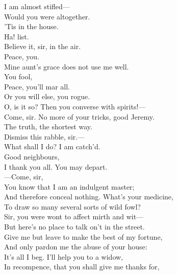 \documentclass[a4paper,oneside]{memoir}
\begin{document}
\begin{drama*}
\dapperspeaks {} I am almost stifled---\\
\facespeaks {} Would you were altogether.\\
\lovewitspeaks {} 'Tis in the house.\\
Ha! list.\\
\facespeaks {} Believe it, sir, in the air.\\
\lovewitspeaks {} Peace, you.\\
\dapperspeaks {} Mine aunt's grace does not use me well.\\
\subtlespeaks {} You fool,\\
Peace, you'll mar all.\\
\facespeaks {}
Or you will else, you rogue.\\
\lovewitspeaks {} O, is it so? Then you converse with spirits!---\\
Come, sir. No more of your tricks, good Jeremy.\\
The truth, the shortest way.\\
\facespeaks {} Dismiss this rabble, sir.---\\
What shall I do? I am catch'd.\\
\lovewitspeaks {} Good neighbours,\\
I thank you all. You may depart.\\
---Come, sir,\\
You know that I am an indulgent master;\\
And therefore conceal nothing. What's your medicine,\\
To draw so many several sorts of wild fowl?\\
\facespeaks Sir, you were wont to affect mirth and wit---\\
But here's no place to talk on't in the street.\\
Give me but leave to make the best of my fortune,\\
And only pardon me the abuse of your house:\\
It's all I beg. I'll help you to a widow,\\
In recompence, that you shall give me thanks for,\\

\end{drama*}
\end{document}
